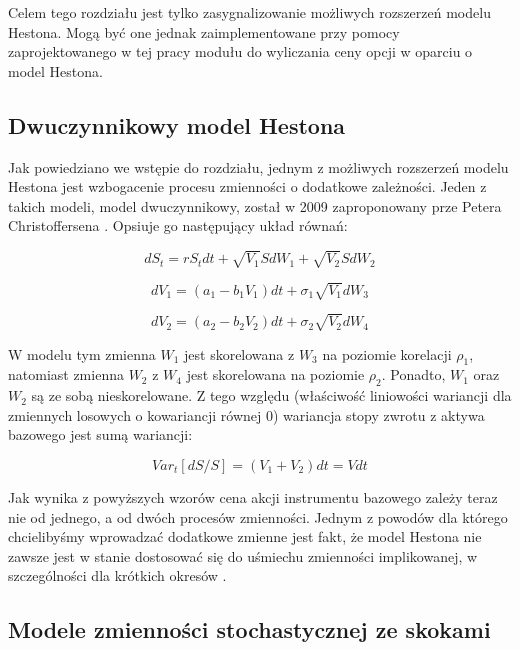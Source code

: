 \documentclass{pracamgr}
\begin{document}
Celem tego rozdziału jest tylko zasygnalizowanie możliwych rozszerzeń modelu Hestona.
Mogą być one jednak zaimplementowane przy pomocy zaprojektowanego w tej pracy modułu 
do wyliczania ceny opcji w oparciu o model Hestona. 

\subsection{Dwuczynnikowy model Hestona} %
\label{sec:modelDwuczynnikowy}
Jak powiedziano we wstępie do rozdziału, jednym z możliwych rozszerzeń modelu Hestona jest wzbogacenie
procesu zmienności o dodatkowe zależności. 
Jeden z takich modeli, model dwuczynnikowy, został w 2009 zaproponowany prze
Petera Christoffersena  \cite{Christoffersen}.
Opsiuje go następujący układ równań:

\begin{equation}
dS_t  = r S_t dt + \sqrt{V_1} S dW_1 + \sqrt{V_2} S dW_2
\end{equation} 

\begin{equation}
dV_1  = (a_1 - b_1 V_1)dt + \sigma_1 \sqrt{V_1} dW_3 
\end{equation}

\begin{equation}
dV_2  = (a_2 - b_2 V_2)dt + \sigma_2 \sqrt{V_2} dW_4 
\end{equation}

W modelu tym zmienna $W_1$ jest skorelowana z $W_3$ na poziomie korelacji $\rho_1$, natomiast
zmienna $W_2$ z $W_4$ jest skorelowana na poziomie $\rho_2$. Ponadto, $W_1$ oraz $W_2$ są ze sobą nieskorelowane. Z tego względu (właściwość
liniowości wariancji dla zmiennych losowych o kowariancji równej $0$) wariancja stopy zwrotu z aktywa
bazowego jest sumą wariancji:

\begin{equation}
  Var_t[dS/S] = (V_1 + V_2)dt = Vdt
\end{equation}

Jak wynika z powyższych wzorów cena akcji instrumentu bazowego zależy teraz nie od jednego, a od 
dwóch procesów zmienności.
Jednym z powodów dla którego chcielibyśmy wprowadzać dodatkowe zmienne jest fakt, że model
Hestona nie zawsze jest w stanie dostosować się do uśmiechu zmienności implikowanej, w szczególności 
dla krótkich okresów \cite{HestonExtensions}.


\subsection{Modele zmienności stochastycznej ze skokami} %
\label{sec:modele_zmienno_ci_stochastycznej_ze_skokami}
 
\end{document}
